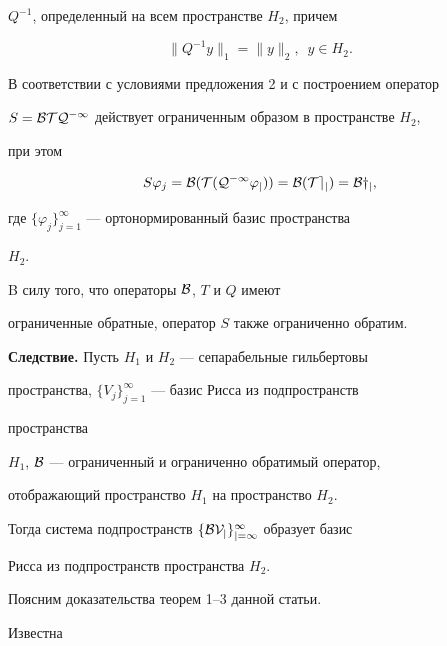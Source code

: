 \begin{pf}
$Q^{-1}$, определенный на всем пространстве $H_2$, причем 


$$ 


\|Q^{-1}y\|_1=\|y\|_2,\ \; y\in H_2. 


$$ 


 


В соответствии с условиями предложения 2 и с построением оператор 


$S=\cal B T Q^{-1}$ действует ограниченным образом в пространстве $H_2$, 


при этом 


$$ 


S\varphi_j=\cal B(T(Q^{-1}\varphi_j))=\cal B(T e_j)=\cal B y_j, 


$$ 


где $\{\varphi_j\}^\infty_{j=1}$ --- ортонормированный базис пространства 


$H_2$. 


 


B силу того, что операторы $\cal B$, $T$ и $Q$ имеют 


ограниченные обратные, оператор $S$ также ограниченно обратим. 


\end{pf} 


 


{\bf Следствие.} Пусть $H_1$ и $H_2$ --- сепарабельные гильбертовы 


пространства, $\{V_j\}^\infty_{j=1}$ --- базис Рисса из подпространств 


пространства 


$H_1$, $\cal B$ --- ограниченный и ограниченно обратимый оператор, 


отображающий пространство $H_1$ на пространство $H_2$. 


 


Тогда система подпространств $\{\cal B V_j\}^\infty_{j=1}$ образует базис 


Рисса из подпространств пространства $H_2$. 


\medskip 


 


Поясним доказательства теорем 1--3 данной статьи. 


 


Известна 


